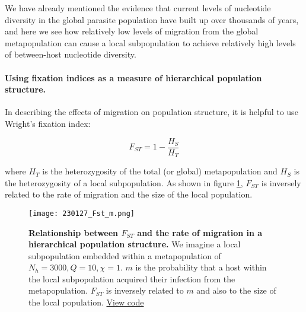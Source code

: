 \documentclass[_main.tex]{subfiles}
\begin{document}
We have already mentioned the evidence that current levels of nucleotide diversity in the global parasite population have built up over thousands of years, and here we see how relatively low levels of migration from the global metapopulation can cause a local subpopulation to achieve relatively high levels of between-host nucleotide diversity.  

\paragraph{Using fixation indices as a measure of hierarchical population structure.}  \label{main_fixation_indices}  In describing the effects of migration on population structure, it is helpful to use Wright's fixation index:

\begin{equation*}
F_{ST} = 1 - \frac{H_S}{H_T}
\end{equation*}

where $H_T$ is the heterozygosity of the total (or global) metapopulation and $H_S$ is the heterozygosity of a local subpopulation.  As shown in figure \ref{fig:main_migration_Fst}, $F_{ST}$ is inversely related to the rate of migration and the size of the local population.

\begin{figure}[h!]
\centering
\texttt{[image: 230127\_Fst\_m.png]}
\caption{\textbf{Relationship between $F_{ST}$ and the rate of migration in a hierarchical population structure.}  We imagine a local subpopulation embedded within a metapopulation of $N_h = 3000, Q = 10, \chi = 1$.  $m$ is the probability that a host within the local subpopulation acquired their infection from the metapopulation. $F_{ST}$ is inversely related to $m$ and also to the size of the local population.
\href{https://github.com/d-kwiat/gtg/blob/main/migration_Fst.ipynb}{View code}
}
\label{fig:main_migration_Fst}
\end{figure}
\end{document}
